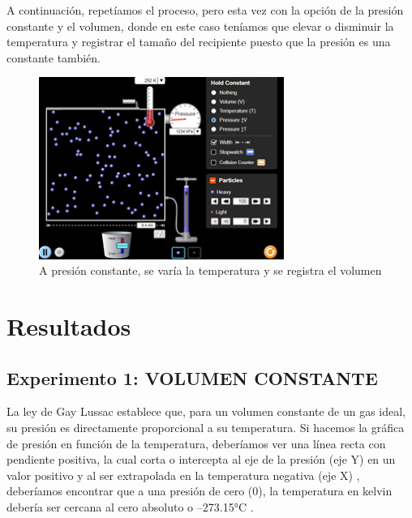 \documentclass[journal,transmag]{IEEEtran}
\begin{document}
	
	A continuación, repetíamos el proceso, pero esta vez con la opción de la presión constante y el volumen, donde en este caso teníamos que elevar o disminuir la temperatura y registrar el tamaño del recipiente puesto que la presión es una constante también. 
	
	\begin{figure}[!h]
				\center
				\includegraphics[width=8cm]{img/isoba2.png}
				\caption{A presión constante, se varía la temperatura y se registra el volumen}
				\label{f12}
	\end{figure}
	
	
\section{Resultados} 

\subsection{Experimento 1: VOLUMEN CONSTANTE}

La ley de Gay Lussac establece que, para un volumen constante de un gas ideal, su presión es directamente proporcional a su temperatura. Si hacemos la gráfica de presión en función de la temperatura, deberíamos ver una línea recta con pendiente positiva, la cual corta o intercepta al eje de la presión (eje Y) en un valor positivo y al ser extrapolada en la temperatura negativa (eje X) , deberíamos encontrar que a una presión de cero (0), la temperatura en kelvin debería ser cercana al cero absoluto o –273.15°C .  
\end{document}
